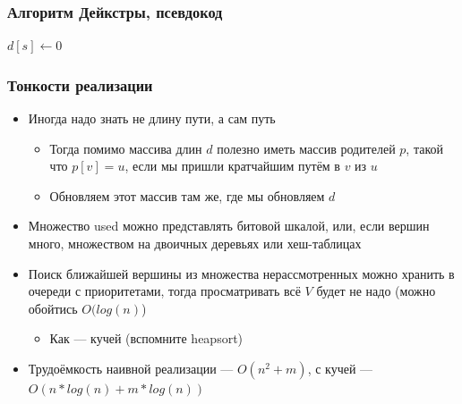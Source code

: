 \documentclass{../../slides-style}
\begin{document}
    \begin{frame}[fragile]
        \frametitle{Алгоритм Дейкстры, псевдокод}
        \begin{scriptsize}
            \begin{algorithm}[H]
                \DontPrintSemicolon

                $d[s] \gets 0$\;

            \end{algorithm}
        \end{scriptsize}
    \end{frame}

    \begin{frame}
        \frametitle{Тонкости реализации}
        \begin{itemize}
            \item Иногда надо знать не длину пути, а сам путь
            \begin{itemize}
                \item Тогда помимо массива длин $d$ полезно иметь массив родителей $p$, такой что $p[v] = u$, если мы пришли кратчайшим путём в $v$ из $u$
                \item Обновляем этот массив там же, где мы обновляем $d$
            \end{itemize}
            \item Множество used можно представлять битовой шкалой, или, если вершин много, множеством на двоичных деревьях или хеш-таблицах
            \item Поиск ближайшей вершины из множества нерассмотренных можно хранить в очереди с приоритетами, тогда просматривать всё $V$ будет не надо (можно обойтись $O(log(n)$)
            \begin{itemize}
                \item Как --- кучей (вспомните heapsort)
            \end{itemize}
            \item Трудоёмкость наивной реализации --- $O(n^2 + m)$, с кучей --- $O(n * log(n) + m * log(n))$
        \end{itemize}
    \end{frame}
\end{document}
